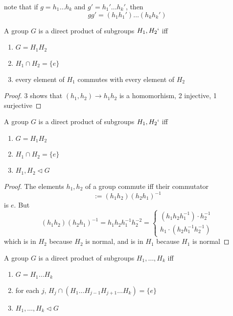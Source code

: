 \documentclass[11pt]{article}
\begin{document}
note that if \(g=h_1\dots h_k\) and \(g'=h_1'\dots h_k'\), then
\begin{equation*}
gg'=(h_1h_1')\dots(h_kh_k')
\end{equation*}

\begin{proposition}[]
A group \(G\) is a direct product of subgroups \(H_1,H_2`\) iff
\begin{enumerate}
\item \(G=H_1H_2\)
\item \(H_1\cap H_2=\{e\}\)
\item every element of \(H_1\) commutes with every element of \(H_2\)
\end{enumerate}
\end{proposition}

\begin{proof}
3 shows that \((h_1,h_2)\to h_1h_2\) is a homomorhism, 2 injective, 1 surjective
\end{proof}

\begin{proposition}[]
\label{1.51}
A group \(G\) is a direct product of subgroups \(H_1,H_2`\) iff
\begin{enumerate}
\item \(G=H_1H_2\)
\item \(H_1\cap H_2=\{e\}\)
\item \(H_1,H_2\lhd G\)
\end{enumerate}
\end{proposition}

\begin{proof}
The elements \(h_1,h_2\) of a group commute iff their commutator
\begin{equation*}
[h_1,h_2]:=(h_1h_2)(h_2h_1)^{-1}
\end{equation*}
is \(e\). But
\begin{equation*}
(h_1h_2)(h_2h_1)^{-1}=h_1h_2h_1^{-1}h_2^{-2}=
\begin{cases}
(h_1h_2h_1^{-1})\cdot h_2^{-1}\\
h_1\cdot(h_2h_1^{-1}h_2^{-1})
\end{cases}
\end{equation*}
which is in \(H_2\) because \(H_2\) is normal, and is in \(H_1\) because \(H_1\) is normal
\end{proof}

\begin{proposition}[]
A group \(G\) is a direct product of subgroups \(H_1,\dots,H_k\) iff
\begin{enumerate}
\item \(G=H_1\dots H_k\)
\item for each \(j\), \(H_j\cap(H_1\dots H_{j-1}H_{j+1}\dots H_k)=\{e\}\)
\item \(H_1,\dots,H_k\lhd G\)
\end{enumerate}
\end{proposition}
\end{document}
